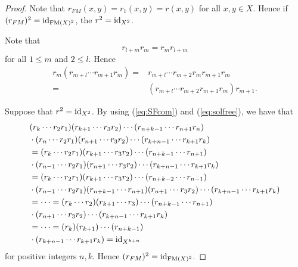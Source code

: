 \begin{proof}
Note that $r_{FM}(x,y)=r_1(x,y)=r(x,y)$ for all $x,y\in X$. Hence if $(r_{FM})^2=\operatorname{id}_{\mathrm{FM}(X)^2}$, the $r^2=\operatorname{id}_{X^2}$.

Note that 
\begin{equation}\label{eq:SFcom}
r_{l+m}r_{m}=r_mr_{l+m}
\end{equation}
for all $1\leq m$ and $2\leq l$. Hence
\begin{align}\label{eq:solfree}
r_m(r_{m+l}\cdots r_{m+1}r_m)=&r_{m+l}\cdots r_{m+2}r_mr_{m+1}r_m\nonumber\\
=&(r_{m+l}\cdots r_{m+2}r_{m+1}r_{m})r_{m+1}.
\end{align}

Suppose that
$r^2=\operatorname{id}_{X^2}$. By using (\ref{eq:SFcom}) and (\ref{eq:solfree}), we have that
\begin{align*}
    &(r_k\cdots r_2r_1)(r_{k+1}\cdots r_3r_2)\cdots(r_{n+k-1}\cdots r_{n+1}r_n)\\
    &\cdot (r_n\cdots r_2r_1)(r_{n+1}\cdots r_3r_2)\cdots(r_{k+n-1}\cdots r_{k+1}r_k)\\
    &=(r_k\cdots r_2r_1)(r_{k+1}\cdots r_3r_2)\cdots(r_{n+k-1}\cdots r_{n+1})\\
    &\cdot (r_{n-1}\cdots r_2r_1)(r_{n+1}\cdots r_3r_2)\cdots(r_{k+n-1}\cdots r_{k+1}r_k)\\
    &=(r_k\cdots r_2r_1)(r_{k+1}\cdots r_3r_2)\cdots(r_{n+k-2}\cdots r_{n-1})\\
    &\cdot (r_{n-1}\cdots r_2r_1)(r_{n+k-1}\cdots r_{n+1})(r_{n+1}\cdots r_3r_2)\cdots(r_{k+n-1}\cdots r_{k+1}r_k)\\
    &=\dots =(r_k\cdots r_2)(r_{k+1}\cdots r_3)\cdots(r_{n+k-1}\cdots r_{n+1})\\
    &\cdot (r_{n+1}\cdots r_3r_2)\cdots(r_{k+n-1}\cdots r_{k+1}r_k)\\
    &=\dots =(r_k)(r_{k+1})\cdots(r_{n+k-1})\\
    &\cdot (r_{k+n-1}\cdots r_{k+1}r_k)=\operatorname{id}_{X^{k+n}}
\end{align*}
for positive integers $n,k$.
Hence $(r_{FM})^2=\operatorname{id}_{\mathrm{FM}(X)^2}$.



\end{proof}
